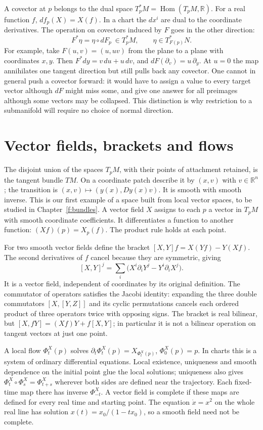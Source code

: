 A covector at $p$ belongs to the dual space $T_p^*M=\operatorname{Hom}(T_pM,\mathbb R)$. For a real function $f$, $df_p(X)=X(f)$. In a chart the $dx^i$ are dual to the coordinate derivatives. The operation on covectors induced by $F$ goes in the other direction:
\[
 F^*\eta=\eta\circ dF_p\ \in T_p^*M,\qquad \eta\in T_{F(p)}^*N .
\]
For example, take $F(u,v)=(u,uv)$ from the plane to a plane with coordinates $x,y$. Then $F^*dy=v\,du+u\,dv$, and $dF(\partial_v)=u\,\partial_y$. At $u=0$ the map annihilates one tangent direction but still pulls back any covector. One cannot in general push a covector forward: it would have to assign a value to every target vector although $dF$ might miss some, and give one answer for all preimages although some vectors may be collapsed. This distinction is why restriction to a submanifold will require no choice of normal direction.

\section{Vector fields, brackets and flows}
The disjoint union of the spaces $T_pM$, with their points of attachment retained, is the tangent bundle $TM$. On a coordinate patch describe it by $(x,v)$ with $v\in\mathbb R^n$; the transition is $(x,v)\mapsto(y(x),D y(x)v)$. It is smooth with smooth inverse. This is our first example of a space built from local vector spaces, to be studied in Chapter~\ref{f:bundles}. A vector field $X$ assigns to each $p$ a vector in $T_pM$ with smooth coordinate coefficients. It differentiates a function to another function: $(Xf)(p)=X_p(f)$. The product rule holds at each point.

For two smooth vector fields define the bracket $[X,Y]f=X(Yf)-Y(Xf)$. The second derivatives of $f$ cancel because they are symmetric, giving
\[
 [X,Y]^j=\sum_i\big(X^i\partial_iY^j-Y^i\partial_iX^j\big).
\]
It is a vector field, independent of coordinates by its original definition. The commutator of operators satisfies the Jacobi identity: expanding the three double commutators $[X,[Y,Z]]$ and its cyclic permutations cancels each ordered product of three operators twice with opposing signs. The bracket is real bilinear, but $[X,fY]=(Xf)Y+f[X,Y]$; in particular it is not a bilinear operation on tangent vectors at just one point.

A local flow $\Phi^X_t(p)$ solves $\partial_t\Phi_t^X(p)=X_{\Phi_t^X(p)}$, $\Phi_0^X(p)=p$. In charts this is a system of ordinary differential equations. Local existence, uniqueness and smooth dependence on the initial point glue the local solutions; uniqueness also gives $\Phi_t^X\circ\Phi_s^X=\Phi_{t+s}^X$ wherever both sides are defined near the trajectory. Each fixed-time map there has inverse $\Phi_{-t}^X$. A vector field is complete if these maps are defined for every real time and starting point. The equation $\dot x=x^2$ on the whole real line has solution $x(t)=x_0/(1-tx_0)$, so a smooth field need not be complete.

